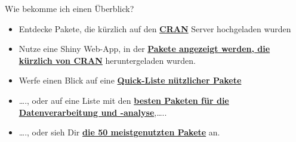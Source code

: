 \documentclass[ignorenonframetext,]{beamer}
\begin{document}
\begin{frame}{Wie bekomme ich einen Überblick?}
\protect\hypertarget{wie-bekomme-ich-einen-uberblick}{}

\begin{itemize}
\item
  Entdecke Pakete, die kürzlich auf den
  \href{https://mran.microsoft.com/packages/}{\textbf{CRAN}} Server
  hochgeladen wurden
\item
  Nutze eine Shiny Web-App, in der
  \href{https://gallery.shinyapps.io/cran-gauge/}{\textbf{Pakete
  angezeigt werden, die kürzlich von CRAN}} heruntergeladen wurden.
\item
  Werfe einen Blick auf eine
  \href{https://support.rstudio.com/hc/en-us/articles/201057987-Quick-list-of-useful-R-packages}{\textbf{Quick-Liste
  nützlicher Pakete}}
\item
  \ldots{}., oder auf eine Liste mit den
  \href{http://www.computerworld.com/article/2921176/business-intelligence/great-r-packages-for-data-import-wrangling-visualization.html}{\textbf{besten
  Paketen für die Datenverarbeitung und -analyse}},\ldots{}..
\item
  \ldots{}., oder sieh Dir
  \href{https://www.r-bloggers.com/the-50-most-used-r-packages/}{\textbf{die
  50 meistgenutzten Pakete}} an.
\end{itemize}

\end{frame}
\end{document}
